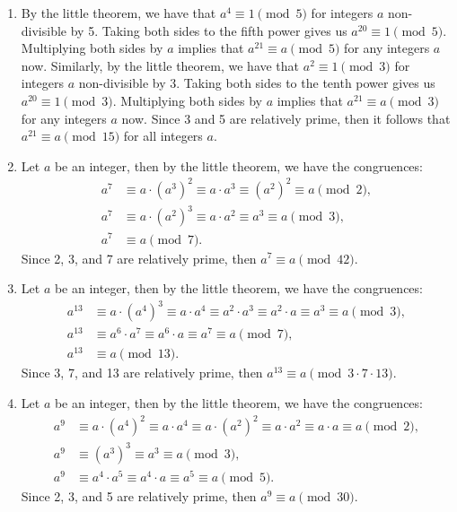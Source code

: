 \begin{solution}
    \begin{enumerate}
        \item By the little theorem, we have that $a^4 \equiv 1 \pmod 5$ for integers $a$ non-divisible by 5. Taking both sides to the fifth power gives us $a^{20} \equiv 1 \pmod 5$. Multiplying both sides by $a$ implies that $a^{21} \equiv a \pmod 5$ for any integers $a$ now. Similarly, by the little theorem, we have that $a^2 \equiv 1 \pmod 3$ for integers $a$ non-divisible by 3. Taking both sides to the tenth power gives us $a^{20} \equiv 1 \pmod 3$. Multiplying both sides by $a$ implies that $a^{21} \equiv a \pmod 3$ for any integers $a$ now. Since 3 and 5 are relatively prime, then it follows that $a^{21} \equiv a \pmod{15}$ for all integers $a$.
        \item Let $a$ be an integer, then by the little theorem, we have the congruences:
        \begin{align*}
            a^7 &\equiv a\cdot (a^{3})^2 \equiv a\cdot a^3 \equiv (a^2)^2 \equiv a \pmod 2, \\
            a^7 &\equiv a \cdot (a^2)^3 \equiv a\cdot a^2 \equiv a^3 \equiv a \pmod 3,\\
            a^7 &\equiv a \pmod 7.
        \end{align*}
        Since 2, 3, and 7 are relatively prime, then $a^7 \equiv a \pmod{42}$.
        \item Let $a$ be an integer, then by the little theorem, we have the congruences:
        \begin{align*}
            a^{13} &\equiv a\cdot (a^{4})^3 \equiv a\cdot a^4 \equiv a^2 \cdot a^3 \equiv a^2 \cdot a \equiv a^3 \equiv a \pmod 3, \\
            a^{13} &\equiv a^6 \cdot a^7 \equiv a^6\cdot a \equiv a^7 \equiv a \pmod 7,\\
            a^{13} &\equiv a \pmod{13}.
        \end{align*}
        Since 3, 7, and 13 are relatively prime, then $a^{13} \equiv a \pmod{3\cdot 7 \cdot 13}$.
        \item Let $a$ be an integer, then by the little theorem, we have the congruences:
        \begin{align*}
            a^9 &\equiv a\cdot (a^{4})^2 \equiv a\cdot a^4 \equiv a \cdot (a^2)^2 \equiv a \cdot a^2 \equiv a \cdot a \equiv a \pmod 2, \\
            a^9 &\equiv (a^3)^3 \equiv a^3 \equiv a \pmod 3,\\
            a^9 &\equiv a^4 \cdot a^5 \equiv a^4 \cdot a \equiv a^5 \equiv a \pmod 5.
        \end{align*}
        Since 2, 3, and 5 are relatively prime, then $a^9 \equiv a \pmod{30}$. \\
    \end{enumerate}
\end{solution}

